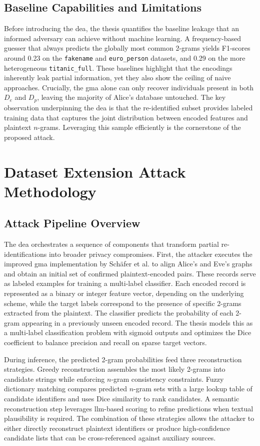 \documentclass[a4paper,11pt]{scrartcl}
\begin{document}
\subsection{Baseline Capabilities and Limitations}
Before introducing the \ac{dea}, the thesis quantifies the baseline leakage that an informed adversary can achieve without machine learning. A frequency-based guesser that always predicts the globally most common 2-grams yields F1-scores around 0.23 on the \texttt{fakename} and \texttt{euro\_person} datasets, and 0.29 on the more heterogeneous \texttt{titanic\_full}. These baselines highlight that the encodings inherently leak partial information, yet they also show the ceiling of naive approaches. Crucially, the \ac{gma} alone can only recover individuals present in both $D_e$ and $D_p$, leaving the majority of Alice's database untouched. The key observation underpinning the \ac{dea} is that the re-identified subset provides labeled training data that captures the joint distribution between encoded features and plaintext $n$-grams. Leveraging this sample efficiently is the cornerstone of the proposed attack.

\section{Dataset Extension Attack Methodology}
\subsection{Attack Pipeline Overview}
The \ac{dea} orchestrates a sequence of components that transform partial re-identifications into broader privacy compromises. First, the attacker executes the improved \ac{gma} implementation by Schäfer et al. to align Alice's and Eve's graphs and obtain an initial set of confirmed plaintext-encoded pairs. These records serve as labeled examples for training a multi-label classifier. Each encoded record is represented as a binary or integer feature vector, depending on the underlying scheme, while the target labels correspond to the presence of specific 2-grams extracted from the plaintext. The classifier predicts the probability of each 2-gram appearing in a previously unseen encoded record. The thesis models this as a multi-label classification problem with sigmoid outputs and optimizes the Dice coefficient to balance precision and recall on sparse target vectors.

During inference, the predicted 2-gram probabilities feed three reconstruction strategies. Greedy reconstruction assembles the most likely 2-grams into candidate strings while enforcing $n$-gram consistency constraints. Fuzzy dictionary matching compares predicted $n$-gram sets with a large lookup table of candidate identifiers and uses Dice similarity to rank candidates. A semantic reconstruction step leverages \ac{llm}-based scoring to refine predictions when textual plausibility is required. The combination of these strategies allows the attacker to either directly reconstruct plaintext identifiers or produce high-confidence candidate lists that can be cross-referenced against auxiliary sources.
\end{document}
